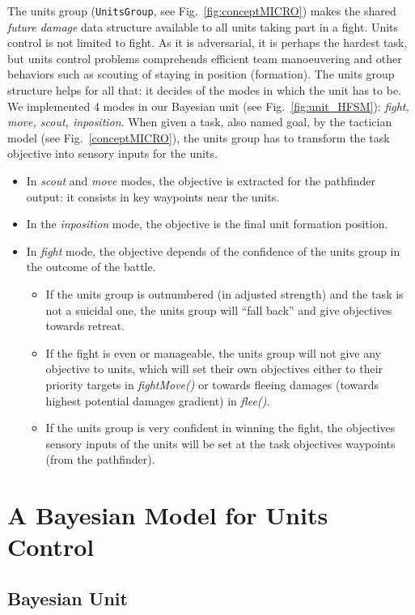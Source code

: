 \label{section:unitsgroup}
The units group (\texttt{UnitsGroup}, see Fig.~\ref{fig:conceptMICRO}) makes the shared \textit{future damage} data structure available to all units taking part in a fight. Units control is not limited to fight. As it is adversarial, it is perhaps the hardest task, but units control problems comprehends efficient team manoeuvering and other behaviors such as scouting of staying in position (formation). The units group structure helps for all that: it decides of the modes in which the unit has to be. We implemented 4 modes in our Bayesian unit (see Fig.~\ref{fig:unit_HFSM}): \textit{fight, move, scout, inposition}. When given a task, also named goal, by the tactician model (see Fig.~\ref{conceptMICRO}), the units group has to transform the task objective into sensory inputs for the units. 
\begin{itemize}
    \item In \textit{scout} and \textit{move} modes, the objective is extracted for the pathfinder output: it consists in key waypoints near the units. 
    \item In the \textit{inposition} mode, the objective is the final unit formation position. 
    \item In \textit{fight} mode, the objective depends of the confidence of the units group in the outcome of the battle. 
\begin{itemize}
    \item If the units group is outnumbered (in adjusted strength) and the task is not a suicidal one, the units group will ``fall back'' and give objectives towards retreat. 
    \item If the fight is even or manageable, the units group will not give any objective to units, which will set their own objectives either to their priority targets in \textit{fightMove()} or towards fleeing damages (towards highest potential damages gradient) in \textit{flee()}.
    \item If the units group is very confident in winning the fight, the objectives sensory inputs of the units will be set at the task objectives waypoints (from the pathfinder).
\end{itemize}
\end{itemize} 

\section{A Bayesian Model for Units Control}

\subsection{Bayesian Unit}

